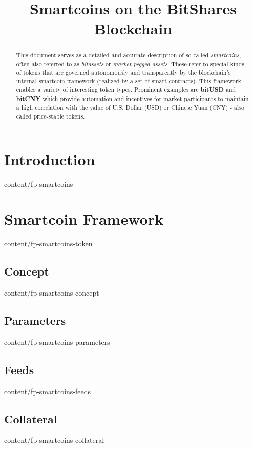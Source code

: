 \documentclass{btswhitepaper}
\title{Smartcoins on the BitShares Blockchain}
\begin{document}
\sloppy
\maketitle

\begin{abstract}%

 This document serves as a detailed and accurate description of so called
 \emph{smartcoins}, often also referred to as \emph{bitassets} or \emph{market
 pegged assets}. These refer to special kinds of tokens that are governed
 autonomously and transparently by the blockchain's internal smartcoin
 framework (realized by a set of smart contracts). This framework enables a variety of
 interesting token types. Prominent examples are \textbf{bitUSD} and
 \textbf{bitCNY} which provide automation and incentives for market
 participants to maintain a high correlation with the value of U.S. Dollar (USD) or
 Chinese Yuan (CNY) - also called price-stable tokens.

\end{abstract}

\section       { Introduction                                     }  { content/fp-smartcoins             }

\section       { Smartcoin Framework                              }  { content/fp-smartcoins-token       }
\subsection    { Concept                                          }  { content/fp-smartcoins-concept     }
\subsection    { Parameters                                       }  { content/fp-smartcoins-parameters  }
\subsection    { Feeds                                            }  { content/fp-smartcoins-feeds       }
\subsection    { Collateral                                       }  { content/fp-smartcoins-collateral  }
\end{document}
